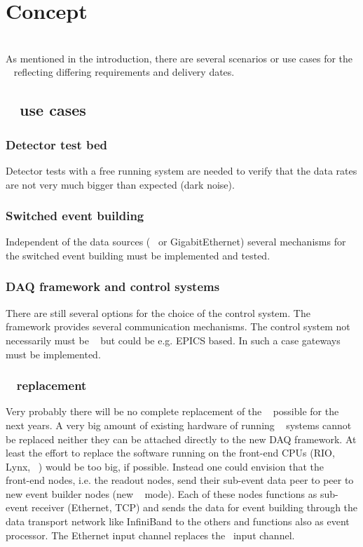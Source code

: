 \section{Concept}
\\
As mentioned in the introduction, there are several scenarios or
use cases for the \DDA~ reflecting differing requirements and
delivery dates.
\subsection{\DDA~ use cases}
\subsubsection{Detector test bed}
Detector tests with a free running system are needed to verify
that the data rates are not very much bigger than expected (dark
noise).
\subsubsection{Switched event building}
Independent of the data sources (\ABB~ or GigabitEthernet) several mechanisms for the switched
event building must be implemented and tested.
\subsubsection{DAQ framework and control systems}
There are still several options for the choice of the control system. The \xdaq~ framework
provides several communication mechanisms. The control system not necessarily must be \xdaq~ but
could be e.g. EPICS based. In such a case gateways must be implemented.
\subsubsection{\mbs~ replacement}
 Very probably there will be no complete
replacement of the \mbs~ possible for the next years. A very big
amount of existing hardware of running \mbs~ systems cannot be
replaced neither they can be attached directly to the new DAQ
framework. At least the effort to replace the software running on
the front-end CPUs (RIO, Lynx, \mbs~) would be too big, if
possible. Instead one could envision that the \mbs~ front-end
nodes, i.e. the readout nodes, send their sub-event data peer to
peer to new event builder nodes (new \mbs~ mode). Each of these
nodes functions as sub-event receiver (Ethernet, TCP) and sends
the data for event building through the data transport network
like InfiniBand to the others and functions also as event
processor. The Ethernet input channel replaces the \ABB~input
channel.
